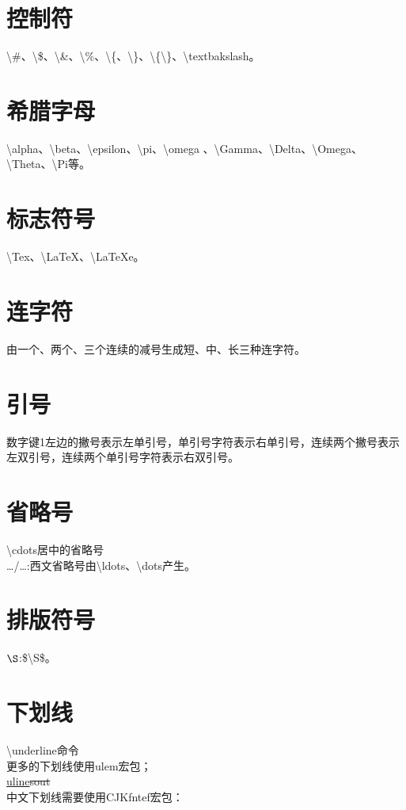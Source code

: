 \documentclass{book}%
\begin{document}
    \section{控制符}
    \textbackslash \#、\textbackslash \$、\textbackslash \&、\textbackslash \%、\textbackslash \{、\textbackslash \}、\textbackslash \{\textbackslash\}、\textbackslash textbakslash。  
    
    \section{希腊字母}
    \textbackslash alpha、\textbackslash beta、\textbackslash epsilon、\textbackslash pi、\textbackslash omega
    、\textbackslash Gamma、\textbackslash Delta、\textbackslash Omega、\textbackslash Theta、\textbackslash Pi等。
    
    \section{标志符号}
    \textbackslash Tex、\textbackslash LaTeX、\textbackslash LaTeXe。
    
    \section{连字符}
    由一个、两个、三个连续的减号生成短、中、长三种连字符。
    
    \section{引号}
    数字键1左边的撇号表示左单引号，单引号字符表示右单引号，连续两个撇号表示左双引号，连续两个单引号字符表示右双引号。
    
    \section{省略号}
    \textbackslash cdots居中的省略号\\
    \ldots/\dots:西文省略号由\textbackslash ldots、\textbackslash dots产生。
    
    \section{排版符号}
    $\S$:\$\textbackslash S\$。
    
    \section{下划线}
    \textbackslash underline命令\\
    更多的下划线使用ulem宏包；\\
    \uline{uline}\quad{}\quad{}\quad\sout{sout}\quad{}\quad{}\quad{}\\
    中文下划线需要使用CJKfntef宏包：\\
    
\end{document}
